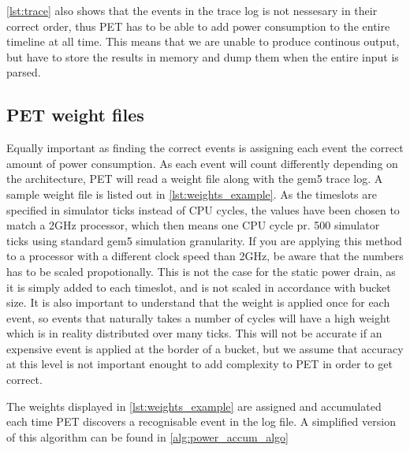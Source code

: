 \autoref{lst:trace} also shows that the events in the trace log is not nessesary in their
correct order, thus PET has to be able to add power consumption to the entire timeline at all
time. This means that we are unable to produce continous output, but have to store the
results in memory and dump them when the entire input is parsed.


\subsection{PET weight files}
Equally important as finding the correct events is assigning each event the
correct amount of power consumption. As each event will count differently
depending on the architecture, PET will read a weight file along with the gem5
trace log. A sample weight file is listed out in \autoref{lst:weights_example}.
As the timeslots are specified in simulator ticks instead of CPU cycles, the
values have been chosen to match a 2GHz processor, which then means one CPU
cycle pr. 500 simulator ticks using standard gem5 simulation granularity.  If
you are applying this method to a processor with a different clock speed than
2GHz, be aware that the numbers has to be scaled propotionally. This is not the
case for the static power drain, as it is simply added to each timeslot, and is
not scaled in accordance with bucket size. It is also important to understand
that the weight is applied once for each event, so events that naturally takes a
number of cycles will have a high weight which is in reality distributed over
many ticks. This will not be accurate if an expensive event is applied at the
border of a bucket, but we assume that accuracy at this level is not important
enought to add complexity to PET in order to get correct.



The weights displayed in \autoref{lst:weights_example} are assigned and
accumulated each time PET discovers a recognisable event in the log file. A
simplified version of this algorithm can be found in
\autoref{alg:power_accum_algo}

